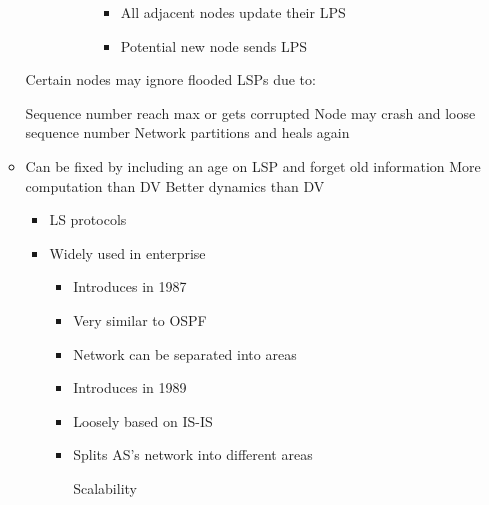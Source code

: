 \begin{itemize}
\begin{itemize}
\begin{itemize}
\begin{itemize}
\begin{itemize}
                                    \begin{itemize}
                                        \item All adjacent nodes update their LPS
                                        \item Potential new node sends LPS
                                    \end{itemize}
                            \end{itemize}
                    \end{itemize}
            \end{itemize}
        \icon Certain nodes may ignore flooded LSPs due to:
            \begin{itemize}
                \icon Sequence number reach max or gets corrupted
                \icon Node may crash and loose sequence number
                \icon Network partitions and heals again
            \end{itemize}
        \item Can be fixed by including an age on LSP and forget old information
        \icon More computation than DV
        \ipro Better dynamics than DV
            \begin{itemize}
                \item LS protocols
                \item Widely used in enterprise
                    \begin{itemize}
                        \item Introduces in 1987
                        \item Very similar to OSPF
                        \item Network can be separated into areas
                    \end{itemize}
                    \begin{itemize}
                        \item Introduces in 1989
                        \item Loosely based on IS-IS
                        \item Splits AS's network into different areas
                            \begin{itemize}
                                \ipro Scalability

\end{itemize}
\end{itemize}
\end{itemize}
\end{itemize}
\end{itemize}
